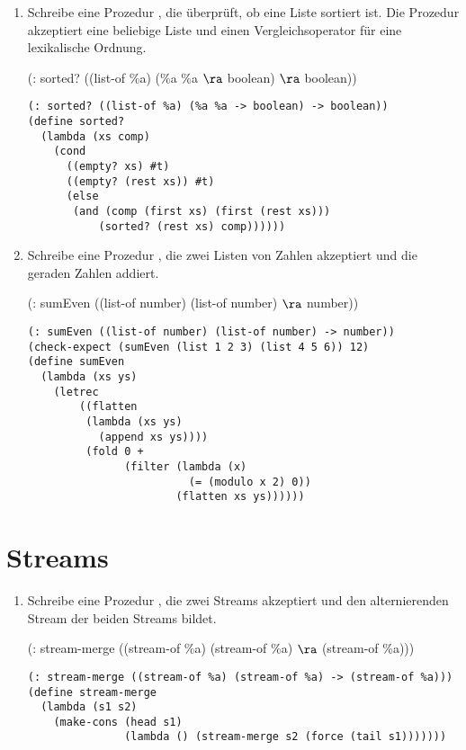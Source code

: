 \documentclass[11pt]{article}
\begin{document}
\begin{enumerate}
	\item Schreibe eine Prozedur , die überprüft, ob eine Liste sortiert ist. Die Prozedur akzeptiert eine beliebige Liste und einen Vergleichsoperator für eine lexikalische Ordnung.
	
	\begin{center}
		(: sorted? ((list-of \%a) (\%a \%a $\ra$ boolean) $\ra$ boolean)) 
	\end{center}
	
	
	\begin{lstlisting}
(: sorted? ((list-of %a) (%a %a -> boolean) -> boolean))
(define sorted?
  (lambda (xs comp)
    (cond
      ((empty? xs) #t)
      ((empty? (rest xs)) #t)
      (else
       (and (comp (first xs) (first (rest xs)))
           (sorted? (rest xs) comp))))))
	\end{lstlisting}
	
	\item Schreibe eine Prozedur , die zwei Listen von Zahlen akzeptiert und die geraden Zahlen addiert.
	
	
	
	\begin{center}
		(: sumEven ((list-of number) (list-of number) $\ra$ number))	
	\end{center}
	
	
	\begin{lstlisting}
(: sumEven ((list-of number) (list-of number) -> number))
(check-expect (sumEven (list 1 2 3) (list 4 5 6)) 12)
(define sumEven
  (lambda (xs ys)
    (letrec
        ((flatten
         (lambda (xs ys)
           (append xs ys))))
         (fold 0 +
               (filter (lambda (x)
                         (= (modulo x 2) 0))
                       (flatten xs ys))))))
	\end{lstlisting}
\end{enumerate}

\section{Streams}

\begin{enumerate}
	\item Schreibe eine Prozedur , die zwei Streams akzeptiert und den alternierenden Stream der beiden Streams bildet.
	
	\begin{center}
		(: stream-merge ((stream-of \%a) (stream-of \%a) $\ra$ (stream-of \%a)))
	\end{center}
	
	
	\begin{lstlisting}
(: stream-merge ((stream-of %a) (stream-of %a) -> (stream-of %a)))
(define stream-merge
  (lambda (s1 s2)
    (make-cons (head s1)
               (lambda () (stream-merge s2 (force (tail s1)))))))
	\end{lstlisting}
\end{enumerate}
\end{document}
